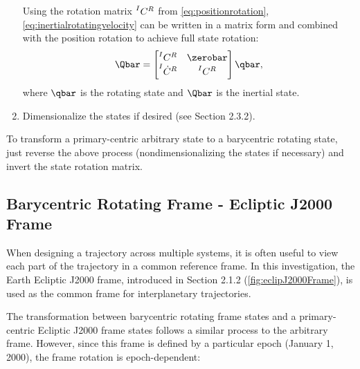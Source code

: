\begin{enumerate}
            Using the rotation matrix $\prescript{I}{}{C}^{R}$ from \cref{eq:positionrotation},
            \cref{eq:inertialrotatingvelocity} can be written in a matrix form and combined with
            the position rotation to achieve full state rotation:
            \begin{equation}
                \Qbar=\begin{bmatrix}   \prescript{I}{}{C}^{R}      &   \zerobar                \\
                                        \prescript{I}{}{\dot{C}}^{R} &   \prescript{I}{}{C}^{R}  \end{bmatrix}\qbar,
                \label{eq:rotation}
            \end{equation}
            where $\qbar$ is the rotating state and $\Qbar$ is the inertial state.
    \item   Dimensionalize the states if desired (see Section 2.3.2).
\end{enumerate}

To transform a primary-centric arbitrary state to a barycentric rotating state, just reverse the
above process (nondimensionalizing the states if necessary) and invert the state rotation matrix.

\subsection{Barycentric Rotating Frame - Ecliptic J2000 Frame}
When designing a trajectory across multiple systems, it is often useful to view each part of the
trajectory in a common reference frame. In this investigation, the Earth Ecliptic J2000 frame,
introduced in Section 2.1.2 (\cref{fig:eclipJ2000Frame}), is used as the common frame for
interplanetary trajectories.

The transformation between barycentric rotating frame states and a primary-centric Ecliptic J2000
frame states follows a similar process to the arbitrary frame. However, since this frame is defined
by a particular epoch (January 1, 2000), the frame rotation is epoch-dependent:

